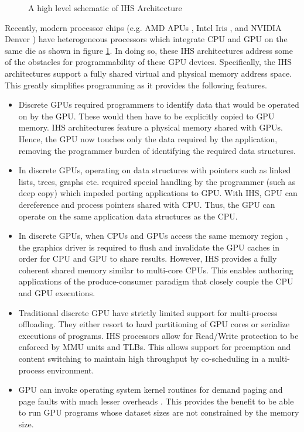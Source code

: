 \begin{figure}[!htb]
	\centering
	\def\svgwidth{\columnwidth}
	
	\caption{A high level schematic of IHS Architecture}
	\label{fig:ihs-schematic}
\end{figure}
\par Recently, modern processor chips (e.g. AMD APUs \cite{amd-apu}, Intel Iris \cite{inteliris}, and NVIDIA Denver \cite{denver}) have heterogeneous processors which integrate CPU and GPU on the same die as shown in figure \ref{fig:ihs-schematic}. In doing so, these IHS architectures address some of the obstacles for programmability of these GPU devices. Specifically, the IHS architectures support a fully shared virtual and physical memory address space. This greatly simplifies programming as it provides the following features.
\begin{itemize}
	\item Discrete GPUs required programmers to identify data that would be operated on by the GPU. These would then have to be explicitly copied to GPU memory. IHS architectures feature a physical memory shared with GPUs. Hence, the GPU now touches only the data required by the application, removing the programmer burden of identifying the required data structures.	
	\item In discrete GPUs, operating on data structures with pointers such as linked lists, trees, graphs etc. required special handling by the programmer (such as deep copy) which impeded porting applications to GPU. With IHS, GPU can dereference and process pointers shared with CPU. Thus, the GPU can operate on the same application data structures as the CPU.
	\item In discrete GPUs, when CPUs and GPUs access the same memory region \cite{uva}, the graphics driver is required to flush and invalidate the GPU caches in order for CPU and GPU to share results. However, IHS provides a fully coherent shared memory similar to multi-core CPUs. This enables authoring applications of the produce-consumer paradigm that closely couple the CPU and GPU executions.
	\item Traditional discrete GPU have strictly limited support for multi-process offloading. They either resort to hard partitioning of GPU cores or serialize executions of programs. IHS processors allow for Read/Write protection to be enforced by MMU units and TLBs. This allows support for preemption and content switching to maintain high throughput by co-scheduling in a multi-process environment.
	\item GPU can invoke operating system kernel routines for demand paging and page faults with much lesser overheads \cite{tlb-translation}. This provides the benefit to be able to run GPU programs whose dataset sizes are not constrained by the memory size. 

\end{itemize}
